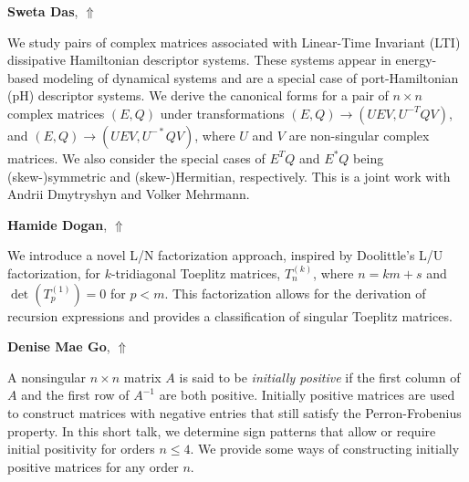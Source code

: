 \documentclass[ILAS2025-program.tex]{subfiles}
\begin{document}
\hypertarget{down0076}{}\begin{ilasabstract}
    
\textbf{Sweta Das},  \hfill \hyperlink{up0076}{$\Uparrow$}
    
    
\mtskip
    We study pairs of complex matrices associated with Linear-Time Invariant (LTI) dissipative Hamiltonian descriptor systems. These systems appear in energy-based modeling of dynamical systems and are a special case of port-Hamiltonian (pH) descriptor systems. We derive the canonical forms for a pair of $n\times n$ complex matrices $(E,Q)$ under transformations $(E,Q) \rightarrow (UEV,U^{-T}QV)$, and $(E,Q) \rightarrow (UEV,U^{-*}QV)$, where $U$ and $V$ are non-singular complex matrices. We also consider the special cases of $E^TQ$ and $E^*Q$ being (skew-)symmetric and (skew-)Hermitian, respectively. This is a joint work with Andrii Dmytryshyn and Volker Mehrmann. 

\end{ilasabstract}
    

\hypertarget{down0400}{}\begin{ilasabstract}
    
\textbf{Hamide Dogan},  \hfill \hyperlink{up0400}{$\Uparrow$}
    
    
\mtskip
    We introduce a novel L/N factorization approach, inspired by Doolittle's L/U factorization, for 
$k$-tridiagonal Toeplitz matrices, $T^{(k)}_n$, where $n=km+s$ and $\det(T^{(1)}_p)=0$ for $p<m$. This factorization allows for the derivation of recursion expressions and provides a classification of singular Toeplitz matrices.
\end{ilasabstract}
    

\hypertarget{down0397}{}\begin{ilasabstract}
    
\textbf{Denise Mae Go},  \hfill \hyperlink{up0397}{$\Uparrow$}
    
    
\mtskip
    A nonsingular $n \times n$ matrix $A$ is said to be \textit{initially positive} if the first column of $A$ and the first row of $A^{-1}$ are both positive. Initially positive matrices are used to construct matrices with negative entries that still satisfy the Perron-Frobenius property. In this short talk, we determine sign patterns that allow or require initial positivity for orders $n \leq 4$. We provide some ways of constructing initially positive matrices for any order $n$.

\end{ilasabstract}
    
\end{document}
